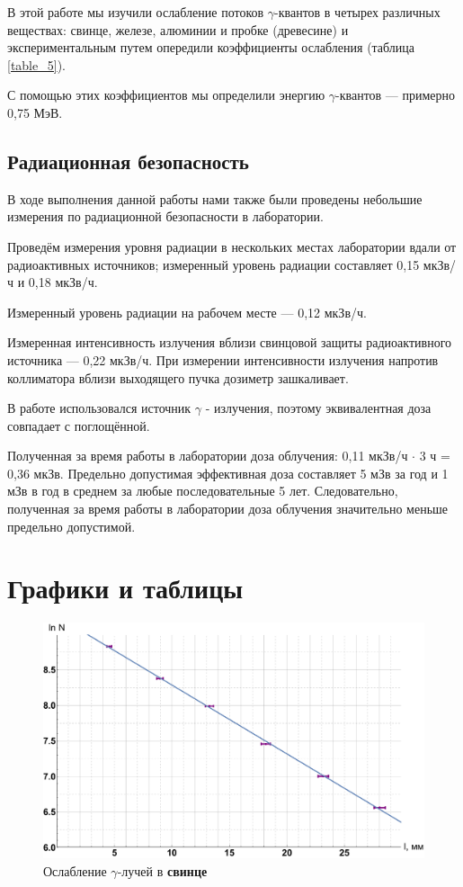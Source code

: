 \documentclass[12pt]{kiarticle} %
\newcommand{\ga}{\ensuremath{\gamma}}
\begin{document}
В этой работе мы изучили ослабление потоков \ga-квантов в четырех различных веществах: свинце, железе, алюминии и пробке (древесине) и экспериментальным путем опередили коэффициенты ослабления (таблица \ref{table_5}). 

С помощью этих коэффициентов мы определили энергию \ga-квантов --- примерно 0,75 МэВ.

\subsection*{Радиационная безопасность}

В ходе выполнения данной работы нами также были проведены небольшие измерения по радиационной безопасности в лаборатории.

Проведём измерения уровня радиации в нескольких местах лаборатории вдали от радиоактивных источников; измеренный уровень радиации составляет 0,15 мкЗв/ч и 0,18 мкЗв/ч.

Измеренный уровень радиации на рабочем месте — 0,12 мкЗв/ч.

Измеренная интенсивность излучения вблизи свинцовой защиты радиоактивного источника — 0,22 мкЗв/ч. При измерении интенсивности излучения напротив коллиматора вблизи выходящего пучка дозиметр зашкаливает.

В работе использовался источник $\gamma$ - излучения, поэтому эквивалентная доза совпадает с поглощённой. 

Полученная за время работы в лаборатории доза облучения: 0,11 мкЗв/ч $\cdot$ 3 ч = 0,36 мкЗв. Предельно допустимая эффективная доза составляет 5 мЗв за год и 1 мЗв в год в среднем за любые последовательные 5 лет. Следовательно, полученная за время работы в лаборатории доза облучения значительно меньше предельно допустимой.

\section*{Графики и таблицы}

\begin{figure}[h!]
	\label{graf_pb}
	\includegraphics[scale=0.47]{pb.pdf}
	\caption{Ослабление \ga-лучей в \textbf{свинце}}
\end{figure}
\end{document}
